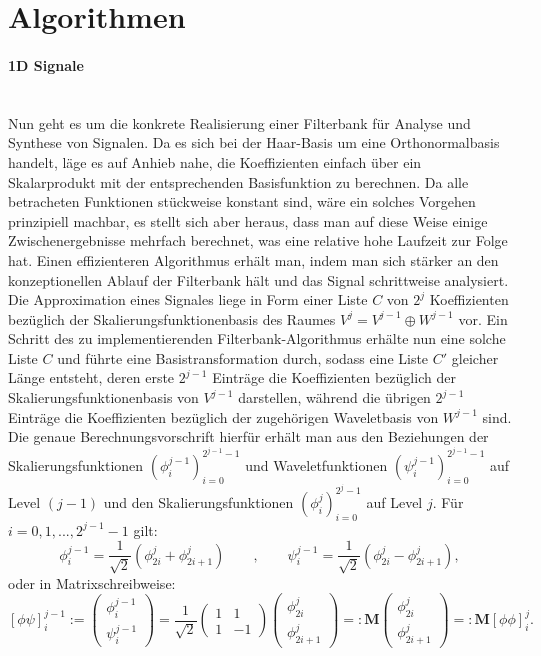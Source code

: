 \section{Algorithmen}
%
\paragraph{1D Signale}~\\
Nun geht es um die konkrete Realisierung einer Filterbank für Analyse und Synthese von Signalen. Da es sich bei der Haar-Basis um eine Orthonormalbasis handelt, läge es auf Anhieb nahe, die Koeffizienten einfach über ein Skalarprodukt mit der entsprechenden Basisfunktion zu berechnen. Da alle betracheten Funktionen stückweise konstant sind, wäre ein solches Vorgehen prinzipiell machbar, es stellt sich aber heraus, dass man auf diese Weise einige Zwischenergebnisse mehrfach berechnet, was eine relative hohe Laufzeit zur Folge hat. Einen effizienteren Algorithmus erhält man, indem man sich stärker an den konzeptionellen Ablauf der Filterbank hält und das Signal schrittweise analysiert.\\
%
Die Approximation eines Signales liege in Form einer Liste $C$ von $2^j$ Koeffizienten bezüglich der Skalierungsfunktionenbasis des Raumes $V^j = V^{j-1} \oplus W^{j-1}$ vor. Ein Schritt des zu implementierenden Filterbank-Algorithmus erhälte nun eine solche Liste $C$ und führte eine Basistransformation durch, sodass eine Liste $C'$ gleicher Länge entsteht, deren erste $2^{j-1}$ Einträge die Koeffizienten bezüglich der Skalierungsfunktionenbasis von $V^{j-1}$ darstellen, während die übrigen $2^{j-1}$ Einträge die Koeffizienten bezüglich der zugehörigen Waveletbasis von $W^{j-1}$ sind.\\
Die genaue Berechnungsvorschrift hierfür erhält man aus den Beziehungen der Skalierungsfunktionen $(\phi_{i}^{j-1})_{i=0}^{2^{j-1}-1}$ und Waveletfunktionen $(\psi_{i}^{j-1})_{i=0}^{2^{j-1}-1}$ auf Level $(j-1)$ und den Skalierungsfunktionen $(\phi_{i}^{j})_{i=0}^{2^{j}-1}$ auf Level $j$. Für $i = 0, 1, ..., 2^{j-1}-1$ gilt:
%
\[
\phi_{i}^{j-1} = \frac{1}{\sqrt{2}}( \phi_{2i}^{j} + \phi_{2i+1}^{j} )
\qquad , \qquad
\psi_{i}^{j-1} = \frac{1}{\sqrt{2}}( \phi_{2i}^{j} - \phi_{2i+1}^{j} )
,
\]
oder in Matrixschreibweise:
\[
\left[ \phi\psi \right]_{i}^{j-1}
:=
\begin{pmatrix}
\phi_{i}^{j-1} \\
\psi_{i}^{j-1}
\end{pmatrix}
=
\frac{1}{\sqrt{2}}
\begin{pmatrix}
1 & 1 \\
1 & -1
\end{pmatrix}
\begin{pmatrix}
\phi_{2i}^{j} \\
\phi_{2i+1}^{j}
\end{pmatrix}
=:
\mathbf{M}
\begin{pmatrix}
\phi_{2i}^{j} \\
\phi_{2i+1}^{j}
\end{pmatrix}
=:
\mathbf{M}
\left[ \phi\phi \right]_{i}^j
.
\]
